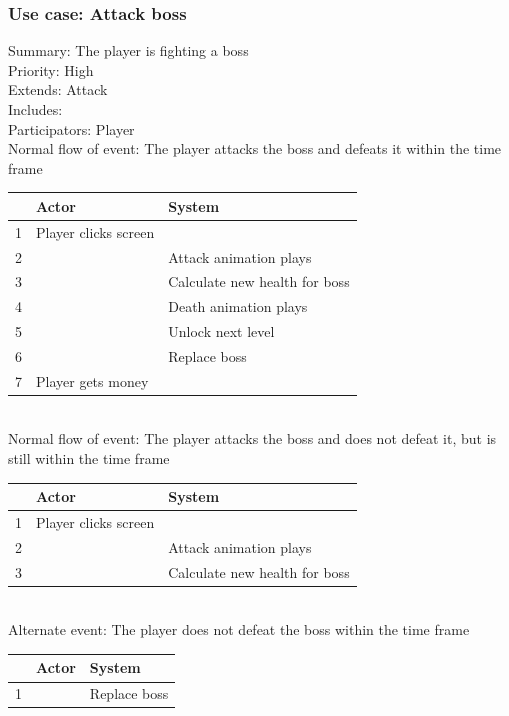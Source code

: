 \documentclass{article}
\begin{document}
\subsubsection{Use case: Attack boss}
Summary: The player is fighting a boss \\
Priority: High \\
Extends: Attack\\
Includes: \\
Participators: Player \\
Normal flow of event: The player attacks the boss and defeats it within the time frame \\
\begin{tabular}{|c|l|l|} \hline
    & Actor & System \\ \hline
    1 & Player clicks screen & \\ \hline
    2 & & Attack animation plays \\ \hline
    3 & & Calculate new health for boss \\ \hline
    4 & & Death animation plays \\ \hline
    5 & & Unlock next level \\ \hline
    6 & & Replace boss \\ \hline
    7 & Player gets money & \\ \hline
\end{tabular}\\
Normal flow of event: The player attacks the boss and does not defeat it, but is still within the time frame \\
\begin{tabular}{|c|l|l|} \hline
    & Actor & System \\ \hline
    1 & Player clicks screen & \\ \hline
    2 & & Attack animation plays \\ \hline
    3 & & Calculate new health for boss \\ \hline
\end{tabular}\\
Alternate event: The player does not defeat the boss within the time frame \\
\begin{tabular}{|c|l|l|} \hline
    & Actor & System \\ \hline
    1 & & Replace boss \\ \hline
\end{tabular}
\end{document}
